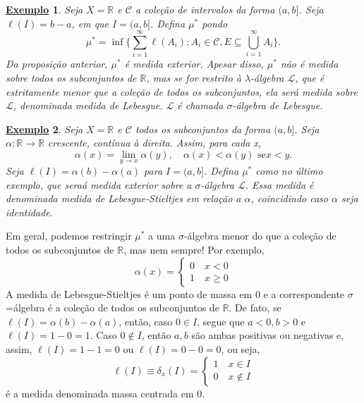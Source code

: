 \documentclass{article}
\newtheorem{example}{\underline{Exemplo}}
\begin{document}
\begin{example}
	Seja \(X = \mathbb{R}\) e \(\mathcal{C}\) a coleção de intervalos da forma \((a, b]\). Seja \(\ell (I) = b- a\), em que \(I = (a, b]\). Defina \(\mu ^{*}\) pondo
	\[
		\mu ^{*} = \inf_{}\biggl\{\sum\limits_{i=1}^{\infty}\ell (A_{i}): A_{i}\in \mathcal{C}, E\subseteq \bigcup_{i=1}^{\infty}A_{i}\biggr\}.
	\]
	Da proposição anterior, \(\mu ^{*}\) é medida exterior. Apesar disso, \(\mu ^{*}\) não é medida sobre todos os subconjuntos de \(\mathbb{R}\), mas se for restrito à \(\lambda \)-álgebra \(\mathcal{L}\), que é estritamente
	menor que a coleção de todos os subconjuntos, ela será medida sobre \(\mathcal{L}\), denominada medida de Lebesgue. \(\mathcal{L}\) é chamada \(\sigma \)-álgebra de Lebesgue.
\end{example}
\begin{example}
	Seja \(X = \mathbb{R}\) e \(\mathcal{C}\) todos os subconjuntos da forma \((a, b]\). Seja \(\alpha : \mathbb{R}\rightarrow \mathbb{R}\) crescente, contínua à direita. Assim, para cada x,
	\[
		\alpha (x) = \lim_{y\to x}\alpha (y),\quad \alpha (x)< \alpha (y) \text{ se} x < y.
	\]
	Seja \(\ell (I) = \alpha (b) - \alpha (a)\) para \(I = (a, b]\). Defina \(\mu ^{*}\) como no último exemplo, que seraá medida exterior sobre a \(\sigma \)-álgebra \(\mathcal{L}\). Essa medida
	é denominada medida de Lebesgue-Stieltjes em relação a \(\alpha \), coincidindo caso \(\alpha \) seja identidade.
\end{example}
Em geral, podemos restringir \(\mu ^{*}\) a uma \(\sigma \)-álgebra menor do que a coleção de todos os subconjuntos de \(\mathbb{R}\), mas nem sempre! Por exemplo,
\[
	\alpha (x)  = \left\{\begin{array}{ll}
		0\quad x < 0 \\
		1\quad x \geq 0
	\end{array}\right.
\]
A medida de Lebesgue-Stieltjes é um ponto de massa em 0 e a correspondente \(\sigma \)=álgebra é a coleção de todos os subconjuntos de \(\mathbb{R}. \) De fato, se \(\ell (I) = \alpha (b) - \alpha (a)\), então, caso \(0\in I\),
segue que \(a < 0, b> 0\) e \(\ell (I) = 1 - 0 = 1\). Caso \(0\not\in I\), então \(a, b\) são ambas positivas ou negativas e, assim, \(\ell (I) = 1 - 1 = 0\) ou \(\ell (I) = 0 - 0 = 0\), ou seja,
\[
	\ell (I) \equiv \delta_{x}(I)  = \left\{\begin{array}{ll}
		1\quad x\in I \\
		0\quad x\not\in I
	\end{array}\right.
\]
é a medida denominada massa centrada em 0.
\end{document}
